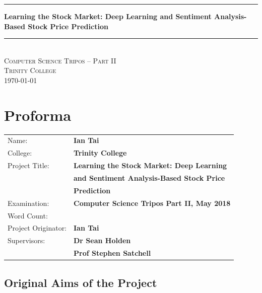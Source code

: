 \documentclass[12pt,a4paper,twoside,openright]{report}
\begin{document}





\thispagestyle{empty}
\vspace*{50mm}
\begin{center}
\rule{\linewidth}{1pt}\vspace{5mm}
\LARGE\textbf{Learning the Stock Market: Deep Learning and Sentiment
Analysis-Based Stock Price Prediction}
\rule{\linewidth}{1pt} \\[10mm]
\Large\textsc{Computer Science Tripos -- Part II \\[5mm]
Trinity College \\[5mm]
\today}  %
\end{center}

\pagestyle{plain}
\setcounter{page}{1} 
\chapter*{Proforma}
{\large
\begin{tabular}{ll}
Name:               & \bf Ian Tai                      \\[-2pt]
College:            & \bf Trinity College                     \\[-2pt]
Project Title:      & \bf Learning the Stock Market: Deep Learning \\[-2pt]
& \bf and Sentiment Analysis-Based Stock Price\\[-2pt]
& \bf Prediction \\[-3pt]
Examination:        & \bf Computer Science Tripos Part II, May 2018  \\[-2pt]
Word Count:         & \footnotemark \\[-3pt]
Project Originator: & \bf Ian Tai                    \\[-2pt]
Supervisors:         & \bf Dr Sean Holden                    \\[-2pt]
& \bf Prof Stephen Satchell
\end{tabular}
}



\section*{Original Aims of the Project}
\end{document}
